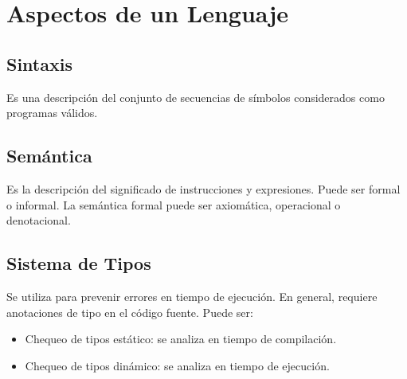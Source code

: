 \section{Aspectos de un Lenguaje}

\subsection{Sintaxis}

Es una descripción del conjunto de secuencias de símbolos considerados como programas válidos.

\subsection{Semántica}

Es la descripción del significado de instrucciones y expresiones. Puede ser formal o informal.
La semántica formal puede ser axiomática, operacional o denotacional.

\subsection{Sistema de Tipos}

Se utiliza para prevenir errores en tiempo de ejecución. En general, requiere anotaciones de tipo en el código fuente. Puede ser:

\begin{itemize}
  \item Chequeo de tipos estático: se analiza en tiempo de compilación.
  \item Chequeo de tipos dinámico: se analiza en tiempo de ejecución.
\end{itemize}
